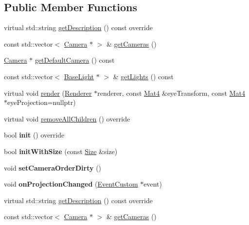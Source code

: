 \subsection*{Public Member Functions}
\begin{DoxyCompactItemize}
\item 
virtual std\+::string \hyperlink{classScene_a81381e50c3ae90f1f5f02ca2ef1c7158}{get\+Description} () const override
\item 
const std\+::vector$<$ \hyperlink{classCamera}{Camera} $\ast$ $>$ \& \hyperlink{classScene_adceefa9911890dde81660ddbc15c34e3}{get\+Cameras} ()
\item 
\hyperlink{classCamera}{Camera} $\ast$ \hyperlink{classScene_a3c0cfe939da06f1ffe9a5ad9914bbde4}{get\+Default\+Camera} () const
\item 
const std\+::vector$<$ \hyperlink{classBaseLight}{Base\+Light} $\ast$ $>$ \& \hyperlink{classScene_abf8fbf57b95e05400254effb2f057125}{get\+Lights} () const
\item 
virtual void \hyperlink{classScene_a26d5468761d68ff0f3beb177bf8d2734}{render} (\hyperlink{classRenderer}{Renderer} $\ast$renderer, const \hyperlink{classMat4}{Mat4} \&eye\+Transform, const \hyperlink{classMat4}{Mat4} $\ast$eye\+Projection=nullptr)
\item 
virtual void \hyperlink{classScene_a7e54f25b14b057ab896b0ef3262cef86}{remove\+All\+Children} () override
\item 
\mbox{\label{classScene_a5afe475d025de4afd4ae430a49cfa8f8}} 
bool {\bfseries init} () override
\item 
\mbox{\label{classScene_a37d7ad2f2d3aafd5ca5b82cf25acb694}} 
bool {\bfseries init\+With\+Size} (const \hyperlink{classSize}{Size} \&size)
\item 
\mbox{\label{classScene_ad0d85e1b04419e7bc8f9c12aa7a8fbc2}} 
void {\bfseries set\+Camera\+Order\+Dirty} ()
\item 
\mbox{\label{classScene_a10d4cc3da3ef635b4ad3e8889e7f317b}} 
void {\bfseries on\+Projection\+Changed} (\hyperlink{classEventCustom}{Event\+Custom} $\ast$event)
\item 
virtual std\+::string \hyperlink{classScene_a072cf51850bc3ec24da49d338c202fe1}{get\+Description} () const override
\item 
const std\+::vector$<$ \hyperlink{classCamera}{Camera} $\ast$ $>$ \& \hyperlink{classScene_a6498f3056fa7a586181fee2bc863edf5}{get\+Cameras} ()

\end{DoxyCompactItemize}
